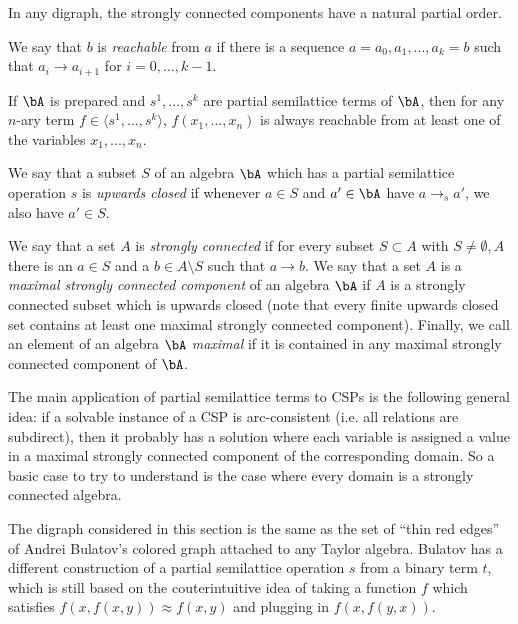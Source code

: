 In any digraph, the strongly connected components have a natural partial order.

\begin{defn} We say that $b$ is \emph{reachable} from $a$ if there is a sequence $a = a_0, a_1, ..., a_k = b$ such that $a_i \rightarrow a_{i+1}$ for $i = 0, ..., k-1$.
\end{defn}

\begin{prop} If $\bA$ is prepared and $s^1, ..., s^k$ are partial semilattice terms of $\bA$, then for any $n$-ary term $f \in \langle s^1, ..., s^k\rangle$, $f(x_1, ..., x_n)$ is always reachable from at least one of the variables $x_1, ..., x_n$.
\end{prop}

\begin{defn} We say that a subset $S$ of an algebra $\bA$ which has a partial semilattice operation $s$ is \emph{upwards closed} if whenever $a\in S$ and $a' \in \bA$ have $a \rightarrow_s a'$, we also have $a' \in S$.
\end{defn}

\begin{defn} We say that a set $A$ is \emph{strongly connected} if for every subset $S \subset A$ with $S\ne \emptyset, A$ there is an $a \in S$ and a $b \in A\setminus S$ such that $a \rightarrow b$. We say that a set $A$ is a \emph{maximal strongly connected component} of an algebra $\bA$ if $A$ is a strongly connected subset which is upwards closed (note that every finite upwards closed set contains at least one maximal strongly connected component). Finally, we call an element of an algebra $\bA$ \emph{maximal} if it is contained in any maximal strongly connected component of $\bA$.
\end{defn}

The main application of partial semilattice terms to CSPs is the following general idea: if a solvable instance of a CSP is arc-consistent (i.e. all relations are subdirect), then it probably has a solution where each variable is assigned a value in a maximal strongly connected component of the corresponding domain. So a basic case to try to understand is the case where every domain is a strongly connected algebra.

\begin{rem} The digraph considered in this section is the same as the set of ``thin red edges'' of Andrei Bulatov's colored graph \cite{colored-graph} attached to any Taylor algebra. Bulatov has a different construction of a partial semilattice operation $s$ from a binary term $t$, which is still based on the couterintuitive idea of taking a function $f$ which satisfies $f(x,f(x,y)) \approx f(x,y)$ and plugging in $f(x,f(y,x))$.
\end{rem}


